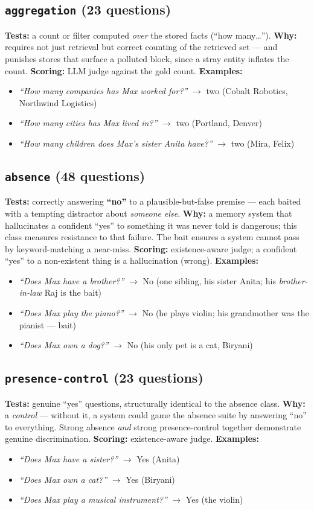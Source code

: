 \documentclass[11pt]{article}
\newcommand{\cat}[2]{\subsection{\texttt{#1} \normalfont\textmd{(#2)}}}
\begin{document}
\cat{aggregation}{23 questions}
\textbf{Tests:} a count or filter computed \emph{over} the stored facts (``how many\ldots''). \textbf{Why:}
requires not just retrieval but correct counting of the retrieved set --- and punishes stores that surface a
polluted block, since a stray entity inflates the count. \textbf{Scoring:} LLM judge against the gold count.
\textbf{Examples:}
\begin{itemize}[nosep]
  \item \emph{``How many companies has Max worked for?''} $\to$ two (Cobalt Robotics, Northwind Logistics)
  \item \emph{``How many cities has Max lived in?''} $\to$ two (Portland, Denver)
  \item \emph{``How many children does Max's sister Anita have?''} $\to$ two (Mira, Felix)
\end{itemize}

\cat{absence}{48 questions}
\textbf{Tests:} correctly answering \textbf{``no''} to a plausible-but-false premise --- each baited with a
tempting distractor about \emph{someone else}. \textbf{Why:} a memory system that hallucinates a confident
``yes'' to something it was never told is dangerous; this class measures resistance to that failure. The bait
ensures a system cannot pass by keyword-matching a near-miss. \textbf{Scoring:} existence-aware judge; a
confident ``yes'' to a non-existent thing is a hallucination (wrong). \textbf{Examples:}
\begin{itemize}[nosep]
  \item \emph{``Does Max have a brother?''} $\to$ No (one sibling, his sister Anita; his \emph{brother-in-law}
  Raj is the bait)
  \item \emph{``Does Max play the piano?''} $\to$ No (he plays violin; his grandmother was the pianist --- bait)
  \item \emph{``Does Max own a dog?''} $\to$ No (his only pet is a cat, Biryani)
\end{itemize}

\cat{presence-control}{23 questions}
\textbf{Tests:} genuine ``yes'' questions, structurally identical to the absence class. \textbf{Why:} a
\emph{control} --- without it, a system could game the absence suite by answering ``no'' to everything. Strong
absence \emph{and} strong presence-control together demonstrate genuine discrimination. \textbf{Scoring:}
existence-aware judge. \textbf{Examples:}
\begin{itemize}[nosep]
  \item \emph{``Does Max have a sister?''} $\to$ Yes (Anita)
  \item \emph{``Does Max own a cat?''} $\to$ Yes (Biryani)
  \item \emph{``Does Max play a musical instrument?''} $\to$ Yes (the violin)
\end{itemize}
\end{document}
